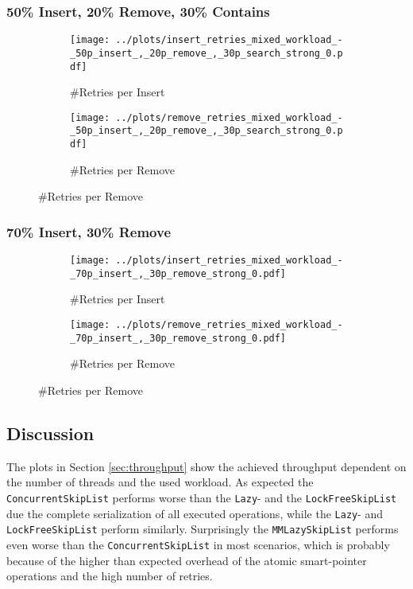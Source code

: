 \subsubsection*{50\% Insert, 20\% Remove, 30\% Contains}

\begin{figure}[H]
    \centering
    \begin{subfigure}[b]{0.49\textwidth}
        \texttt{[image: ../plots/insert\_retries\_mixed\_workload\_-\_50p\_insert\_,\_20p\_remove\_,\_30p\_search\_strong\_0.pdf]}
        \caption{\#Retries per Insert}
        \label{fig:insert_retries_mixed_workload_:1}
    \end{subfigure}
    \begin{subfigure}[b]{0.49\textwidth}
        \texttt{[image: ../plots/remove\_retries\_mixed\_workload\_-\_50p\_insert\_,\_20p\_remove\_,\_30p\_search\_strong\_0.pdf]}
        \caption{\#Retries per Remove}
    \end{subfigure}
\end{figure}

\subsubsection*{70\% Insert, 30\% Remove}

\begin{figure}[H]
    \centering
    \begin{subfigure}[b]{0.49\textwidth}
        \texttt{[image: ../plots/insert\_retries\_mixed\_workload\_-\_70p\_insert\_,\_30p\_remove\_strong\_0.pdf]}
        \caption{\#Retries per Insert}
        \label{fig:insert_retries_mixed_workload_:2}
    \end{subfigure}
       \begin{subfigure}[b]{0.49\textwidth}
        \texttt{[image: ../plots/remove\_retries\_mixed\_workload\_-\_70p\_insert\_,\_30p\_remove\_strong\_0.pdf]}
        \caption{\#Retries per Remove}
    \end{subfigure}
\end{figure}


\subsection{Discussion}

The plots in Section \ref{sec:throughput} show the achieved throughput dependent on the number of threads and the used workload. As expected the \texttt{ConcurrentSkipList} performs worse than the \texttt{Lazy}- and the \texttt{LockFreeSkipList} due the complete serialization of all executed operations, while the \texttt{Lazy}- and \texttt{LockFreeSkipList} perform similarly. Surprisingly the \texttt{MMLazySkipList} performs even worse than the \texttt{ConcurrentSkipList} in most scenarios, which is probably because of the higher than expected overhead of the atomic smart-pointer operations and the high number of retries.\\

